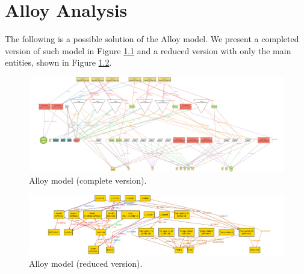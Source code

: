 \chapter{Alloy Analysis}
\label{cha:alloy}

The following is a possible solution of the Alloy model. We present a completed version of such model in Figure \ref{fig:completeAlloy} and a reduced version with only the main entities, shown in Figure \ref{fig:reducedAlloy}.


\begin{figure}
    \includegraphics[width=\textwidth]{./alloy/complete_version.png}
    \caption{Alloy model (complete version).}
    \label{fig:completeAlloy}
\end{figure}

\begin{figure}
    \includegraphics[width=\textwidth]{./alloy/reduced_version.png}
    \caption{Alloy model (reduced version).}
    \label{fig:reducedAlloy}
\end{figure}
